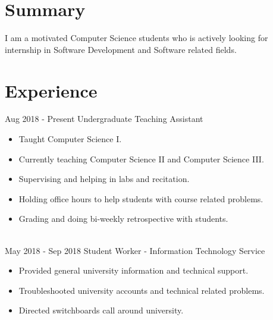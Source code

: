 \documentclass[letterpaper]{twentysecondcv} %
\begin{document}
\makeprofile %
 \section{Summary}
    I am a motivated Computer Science students who is actively looking for internship in Software Development and Software related fields.

\section{Experience}

\begin{twenty} %
\twentyitem
    	{Aug 2018 -}
		{Present}
        {Undergraduate Teaching Assistant}
        {}
        {}
        {\begin{itemize}
        \item Taught Computer Science I.
        \item Currently teaching Computer Science II and Computer Science III.
        \item Supervising and helping in labs and recitation.
        \item Holding office hours to help students with course related problems.
        \item Grading and doing bi-weekly retrospective with students.
        \end{itemize}}
        \\
	\twentyitem
    	{May 2018 -}
		{Sep 2018}
        {Student Worker - Information Technology Service}
        {}
        {}
        {
        {\begin{itemize}
        \item Provided general university information and technical support.
        \item Troubleshooted university accounts and technical related problems.
        \item Directed switchboards call around university.
    \end{itemize}}
        }
    
        
\end{twenty}

\end{document}
